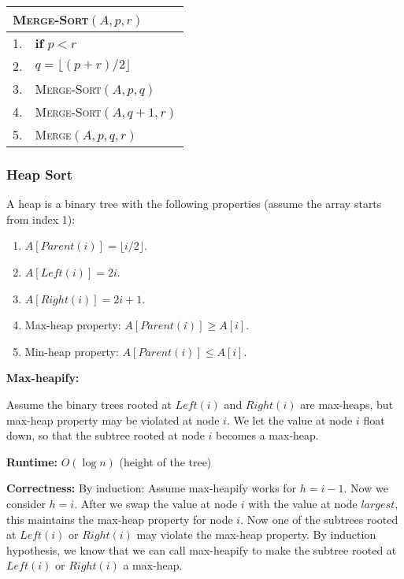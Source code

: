 \documentclass[a4paper,12pt]{article}
\begin{document}
\begin{center}
	\begin{tabular}{ll}
		\toprule
		\multicolumn{2}{l}{\textsc{Merge-Sort}$(A, p, r)$} \\
		\midrule
		1. & \textbf{if} $p < r$ \\
		2. & \quad $q = \lfloor (p + r) / 2 \rfloor$ \\
		3. & \quad \textsc{Merge-Sort}$(A, p, q)$ \\
		4. & \quad \textsc{Merge-Sort}$(A, q + 1, r)$ \\
		5. & \quad \textsc{Merge}$(A, p, q, r)$ \\
		\bottomrule
	\end{tabular}
\end{center}

\subsubsection{Heap Sort}

A heap is a binary tree with the following properties (assume the array starts from index 1):
\begin{enumerate}
	\item $A[Parent(i)] = \lfloor i / 2 \rfloor$.
	\item $A[Left(i)] = 2i$.
	\item $A[Right(i)] = 2i + 1$.
	\item Max-heap property: $A[Parent(i)] \geq A[i]$.
	\item Min-heap property: $A[Parent(i)] \leq A[i]$.
\end{enumerate}

\vspace{1cm}
\textbf{Max-heapify:}

Assume the binary trees rooted at $Left(i)$ and $Right(i)$ are max-heaps, but max-heap property may be violated at node $i$.
We let the value at node $i$ float down, so that the subtree rooted at node $i$ becomes a max-heap.

\textbf{Runtime:} 
$O(\log n)$ (height of the tree)

\textbf{Correctness:} 
By induction:
Assume max-heapify works for $h = i - 1$.
Now we consider $h = i$.
After we swap the value at node $i$ with the value at node $largest$, this maintains the max-heap property for node $i$.
Now one of the subtrees rooted at $Left(i)$ or $Right(i)$ may violate the max-heap property.
By induction hypothesis, we know that we can call max-heapify to make the subtree rooted at $Left(i)$ or $Right(i)$ a max-heap.
\end{document}
